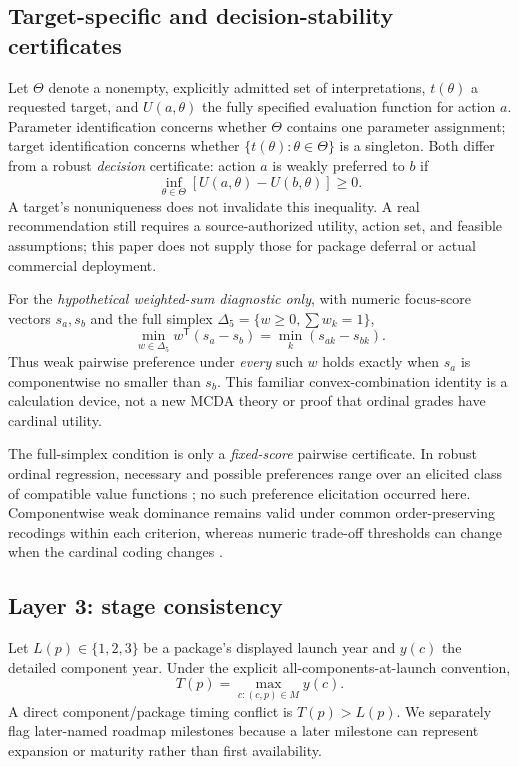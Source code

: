 \documentclass[systems,article,submit,moreauthors]{Definitions/mdpi}
\begin{document}
\subsection{Target-specific and decision-stability certificates}
Let $\Theta$ denote a nonempty, explicitly admitted set of interpretations, $t(\theta)$ a requested target, and $U(a,\theta)$ the fully specified evaluation function for action $a$. Parameter identification concerns whether $\Theta$ contains one parameter assignment; target identification concerns whether $\{t(\theta):\theta\in\Theta\}$ is a singleton. Both differ from a robust \emph{decision} certificate: action $a$ is weakly preferred to $b$ if
\[
\inf_{\theta\in\Theta}\left[U(a,\theta)-U(b,\theta)\right]\geq 0.
\]
A target's nonuniqueness does not invalidate this inequality. A real recommendation still requires a source-authorized utility, action set, and feasible assumptions; this paper does not supply those for package deferral or actual commercial deployment.

For the \emph{hypothetical weighted-sum diagnostic only}, with numeric focus-score vectors $s_a,s_b$ and the full simplex $\Delta_5=\{w\geq0,\sum w_k=1\}$,
\[
\min_{w\in\Delta_5}w^{\mathsf T}(s_a-s_b)=\min_k(s_{ak}-s_{bk}).
\]
Thus weak pairwise preference under \emph{every} such $w$ holds exactly when $s_a$ is componentwise no smaller than $s_b$. This familiar convex-combination identity is a calculation device, not a new MCDA theory or proof that ordinal grades have cardinal utility.

The full-simplex condition is only a \emph{fixed-score} pairwise certificate. In robust ordinal regression, necessary and possible preferences range over an elicited class of compatible value functions \cite{Greco2008}; no such preference elicitation occurred here. Componentwise weak dominance remains valid under common order-preserving recodings within each criterion, whereas numeric trade-off thresholds can change when the cardinal coding changes \cite{PunkkaSalo2014}.


\subsection{Layer 3: stage consistency}
Let $L(p)\in\{1,2,3\}$ be a package's displayed launch year and $y(c)$ the detailed component year. Under the explicit all-components-at-launch convention,
\[
T(p)=\max_{c:(c,p)\in M} y(c).
\]
A direct component/package timing conflict is $T(p)>L(p)$. We separately flag later-named roadmap milestones because a later milestone can represent expansion or maturity rather than first availability.
\end{document}
